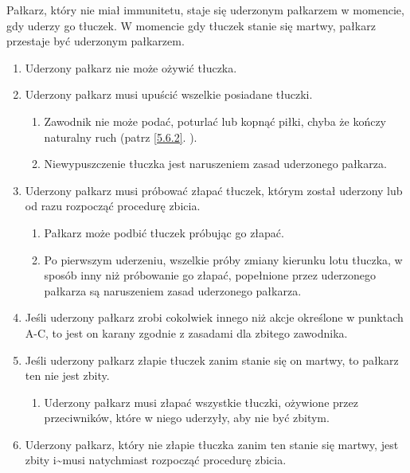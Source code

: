 \documentclass[11pt,a4paper]{article}
\newcommand{\myref}[1]{\ref{#1}. \nameref{#1}}
\begin{document}
Pałkarz, który nie miał immunitetu, staje się uderzonym pałkarzem w
momencie, gdy uderzy go tłuczek. W momencie gdy tłuczek stanie się
martwy, pałkarz przestaje być uderzonym pałkarzem.

\begin{enumerate}

\item
  Uderzony pałkarz nie może ożywić tłuczka.
\item
  Uderzony pałkarz musi upuścić wszelkie posiadane tłuczki.

  \begin{enumerate}
  
  \item
    Zawodnik nie może podać, poturlać lub kopnąć piłki, chyba że kończy
    naturalny ruch (patrz \myref{5.6.2}).
  \item
    Niewypuszczenie tłuczka jest naruszeniem zasad uderzonego pałkarza.
  \end{enumerate}
\item
  Uderzony pałkarz musi próbować złapać tłuczek, którym został uderzony
  lub od razu rozpocząć procedurę zbicia.

  \begin{enumerate}
  
  \item
    Pałkarz może podbić tłuczek próbując go złapać.
  \item
    Po pierwszym uderzeniu, wszelkie próby zmiany kierunku lotu tłuczka,
    w sposób inny niż próbowanie go złapać, popełnione przez uderzonego
    pałkarza są naruszeniem zasad uderzonego pałkarza.
  \end{enumerate}
\item
  Jeśli uderzony pałkarz zrobi cokolwiek innego niż akcje określone w
  punktach A-C, to jest on karany zgodnie z zasadami dla zbitego
  zawodnika.
\item
  Jeśli uderzony pałkarz złapie tłuczek zanim stanie się on martwy, to
  pałkarz ten nie jest zbity.

  \begin{enumerate}
  
  \item
    Uderzony pałkarz musi złapać wszystkie tłuczki, ożywione przez
    przeciwników, które w niego uderzyły, aby nie być zbitym.
  \end{enumerate}
\item
  Uderzony pałkarz, który nie złapie tłuczka zanim ten stanie się
  martwy, jest zbity i\textasciitilde{}musi natychmiast rozpocząć
  procedurę zbicia.
\end{enumerate}
\end{document}
